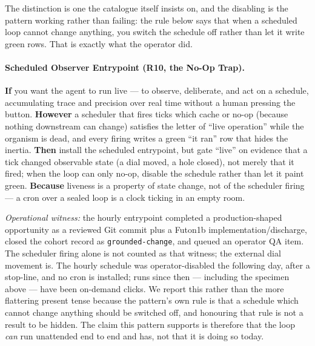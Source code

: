 The distinction is one the catalogue itself insists on, and the disabling is the
pattern working rather than failing: the rule below says that when a scheduled
loop cannot change anything, you switch the schedule off rather than let it
write green rows.  That is exactly what the operator did.

\paragraph{Scheduled Observer Entrypoint (R10, the No-Op Trap).\apparatusmark{}} \textbf{If} you want the agent to run live --- to observe, deliberate, and act on a schedule, accumulating trace and precision over real time without a human pressing the button. \textbf{However} a scheduler that fires ticks which cache or no-op (because nothing downstream can change) satisfies the letter of ``live operation'' while the organism is dead, and every firing writes a green ``it ran'' row that hides the inertia. \textbf{Then} install the scheduled entrypoint, but gate ``live'' on evidence that a tick changed observable state (a dial moved, a hole closed), not merely that it fired; when the loop can only no-op, disable the schedule rather than let it paint green. \textbf{Because} liveness is a property of state change, not of the scheduler firing --- a cron over a sealed loop is a clock ticking in an empty room.

\emph{Operational witness:} the hourly entrypoint completed a production-shaped opportunity as a reviewed Git commit plus a Futon1b implementation/discharge, closed the cohort record as \texttt{grounded-change}, and queued an operator QA item.  The scheduler firing alone is not counted as that witness; the external dial movement is.  The hourly schedule was operator-disabled the following day, after a stop-line, and no cron is installed; runs since then --- including the specimen above --- have been on-demand clicks.  We report this rather than the more flattering present tense because the pattern's own rule is that a schedule which cannot change anything should be switched off, and honouring that rule is not a result to be hidden.  The claim this pattern supports is therefore that the loop \emph{can} run unattended end to end and has, not that it is doing so today.

